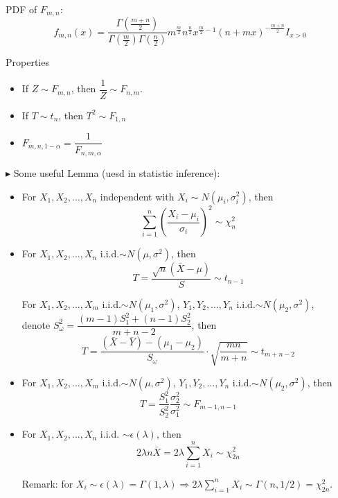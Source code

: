 \documentclass[11pt,a4paper]{ctexart}
\numberwithin{equation}{section}%
\newenvironment{point}{\raggedright$\blacktriangleright$}{}%
\begin{document}
\begin{itemize}
            PDF of $F_{m,n}$:
            \[
                f_{m,n}(x)=\frac{\Gamma(\frac{m+n}{2})}{\Gamma(\frac{m}{2})\Gamma(\frac{n}{2})}m^\frac{m}{2}n^{\frac{n}{2}}x^{\frac{m}{2}-1}(n+mx)^{-\frac{m+n}{2}} I_{x>0}
            \]

            Properties
            \begin{itemize}
                \item If $Z\sim F_{m,n}$, then $\dfrac{1}{Z}\sim F_{n,m}$.
                \item If $T\sim t_n$, then $T^2\sim F_{1,n}$
                \item $F_{m,n,1-\alpha}=\dfrac{1}{F_{n,m,\alpha}}$
            \end{itemize}
        \end{itemize}

        \begin{point}
            Some useful Lemma (uesd in statistic inference):
        \end{point}
        
            
        \begin{itemize}
            \item For $X_1,X_2,\ldots,X_n$ independent with $X_i\sim N(\mu_i,\sigma^2_i)$, then
            \[
                \sum_{i=1}^n\left(\frac{X_i-\mu_i}{\sigma_i}\right)^2\sim \chi^2_n
            \]  
            \item For $X_1,X_2,\ldots,X_n$ i.i.d.$\sim N(\mu,\sigma^2)$, then
            \[
                T=\frac{\sqrt{n}(\bar{X}-\mu)}{S}\sim t_{n-1}   
            \]
            
            For $X_1,X_2,\ldots,X_m$ i.i.d.$\sim N(\mu_1,\sigma^2)$, $Y_1,Y_2,\ldots,Y_n$ i.i.d.$\sim N(\mu_2,\sigma^2)$, \\ denote $S_{\omega}^2=\dfrac{(m-1)S^2_1+(n-1)S^2_2}{m+n-2}$, then
            \[
                T=\frac{(\bar{X}-\bar{Y})-(\mu_1-\mu_2)}{S_{\omega}}\cdot \sqrt{\frac{mn}{m+n}}\sim t_{m+n-2}
            \]
            \item For $X_1,X_2,\ldots,X_m$ i.i.d.$\sim N(\mu,\sigma^2)$, $Y_1,Y_2,\ldots,Y_n$ i.i.d.$\sim N(\mu_2,\sigma^2)$, then
            \[
                T=\frac{S_1^2}{S_2^2}\frac{\sigma^2_2}{\sigma^2_1}\sim F_{m-1,n-1}   
            \]
            \item For $X_1,X_2,\ldots,X_n$ i.i.d. $\sim \epsilon(\lambda)$, then
            \[
                2\lambda n\bar{X}=2\lambda\sum_{i=1}^nX_i \sim\chi^2_{2n} 
            \]

            Remark: for $X_i\sim\epsilon(\lambda)=\Gamma(1,\lambda)\Rightarrow 2\lambda\sum_{i=1}^nX_i\sim\Gamma(n,1/2)=\chi^2_{2n}$. 
        \end{itemize}
\end{document}
